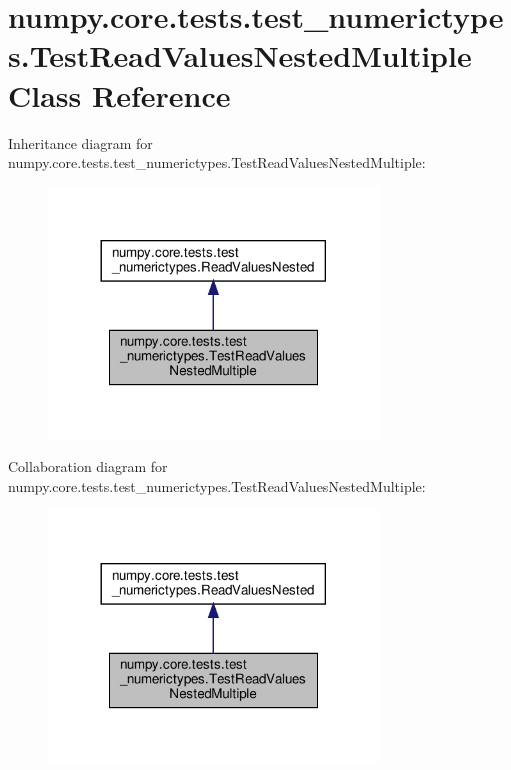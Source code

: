 \hypertarget{classnumpy_1_1core_1_1tests_1_1test__numerictypes_1_1TestReadValuesNestedMultiple}{}\section{numpy.\+core.\+tests.\+test\+\_\+numerictypes.\+Test\+Read\+Values\+Nested\+Multiple Class Reference}
\label{classnumpy_1_1core_1_1tests_1_1test__numerictypes_1_1TestReadValuesNestedMultiple}


Inheritance diagram for numpy.\+core.\+tests.\+test\+\_\+numerictypes.\+Test\+Read\+Values\+Nested\+Multiple\+:
\nopagebreak
\begin{figure}[H]
\begin{center}
\leavevmode
\includegraphics[width=248pt]{classnumpy_1_1core_1_1tests_1_1test__numerictypes_1_1TestReadValuesNestedMultiple__inherit__graph}
\end{center}
\end{figure}


Collaboration diagram for numpy.\+core.\+tests.\+test\+\_\+numerictypes.\+Test\+Read\+Values\+Nested\+Multiple\+:
\nopagebreak
\begin{figure}[H]
\begin{center}
\leavevmode
\includegraphics[width=248pt]{classnumpy_1_1core_1_1tests_1_1test__numerictypes_1_1TestReadValuesNestedMultiple__coll__graph}
\end{center}
\end{figure}
